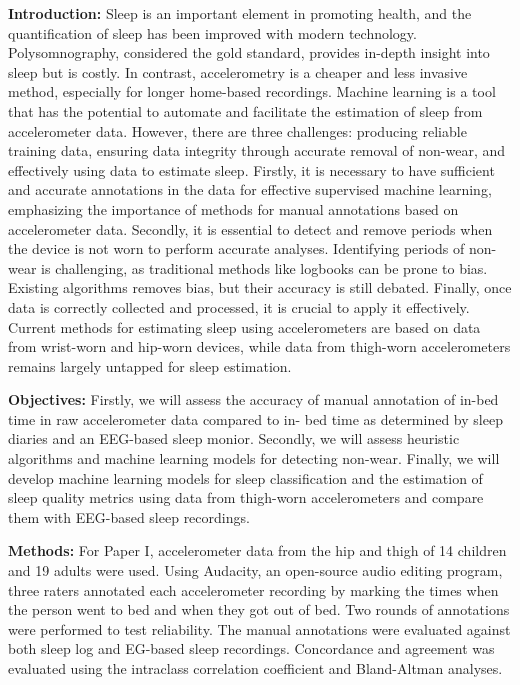 \documentclass[
  10pt,
]{scrbook}
\let\originaltextbf\textbf
\renewcommand{\textbf}[1]{\textcolor{color1}{\textsf{\originaltextbf{#1}}}}
\begin{document}
\textbf{Introduction:} Sleep is an important element in promoting
health, and the quantification of sleep has been improved with modern
technology. Polysomnography, considered the gold standard, provides
in-depth insight into sleep but is costly. In contrast, accelerometry is
a cheaper and less invasive method, especially for longer home-based
recordings. Machine learning is a tool that has the potential to
automate and facilitate the estimation of sleep from accelerometer data.
However, there are three challenges: producing reliable training data,
ensuring data integrity through accurate removal of non-wear, and
effectively using data to estimate sleep. Firstly, it is necessary to
have sufficient and accurate annotations in the data for effective
supervised machine learning, emphasizing the importance of methods for
manual annotations based on accelerometer data. Secondly, it is
essential to detect and remove periods when the device is not worn to
perform accurate analyses. Identifying periods of non-wear is
challenging, as traditional methods like logbooks can be prone to bias.
Existing algorithms removes bias, but their accuracy is still debated.
Finally, once data is correctly collected and processed, it is crucial
to apply it effectively. Current methods for estimating sleep using
accelerometers are based on data from wrist-worn and hip-worn devices,
while data from thigh-worn accelerometers remains largely untapped for
sleep estimation.

\textbf{Objectives:} Firstly, we will assess the accuracy of manual
annotation of in-bed time in raw accelerometer data compared to in- bed
time as determined by sleep diaries and an EEG-based sleep monior.
Secondly, we will assess heuristic algorithms and machine learning
models for detecting non-wear. Finally, we will develop machine learning
models for sleep classification and the estimation of sleep quality
metrics using data from thigh-worn accelerometers and compare them with
EEG-based sleep recordings.

\textbf{Methods:} For Paper I, accelerometer data from the hip and thigh
of 14 children and 19 adults were used. Using Audacity, an open-source
audio editing program, three raters annotated each accelerometer
recording by marking the times when the person went to bed and when they
got out of bed. Two rounds of annotations were performed to test
reliability. The manual annotations were evaluated against both sleep
log and EG-based sleep recordings. Concordance and agreement was
evaluated using the intraclass correlation coefficient and Bland-Altman
analyses.
\end{document}
